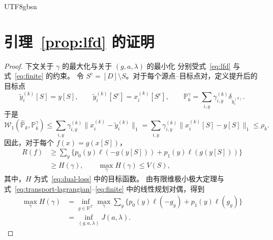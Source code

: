 \documentclass[11pt,a4paper]{article}
\theoremstyle{plain}
\begin{document}
\begin{CJK*}{UTF8}{gbsn}
\FloatBarrier
\appendix
\section{引理~\ref{prop:lfd} 的证明}\label{app:recovery}
\begin{proof}
下文关于 $\gamma$ 的最大化与关于 $(g,a,\lambda)$ 的最小化
分别受式~\eqref{eq:lfd} 与式~\eqref{eq:finite} 的约束。
令 $S^c=[D]\setminus S$。对于每个源点--目标点对，定义提升后的目标点
\[
\widetilde y_i^{(k)}[S]=y[S],\qquad
\widetilde y_i^{(k)}[S^c]=x_i^{(k)}[S^c],\qquad
\mathbb P_k^\gamma=\sum_{i,y}\gamma_{i,y}^{(k)}
\delta_{\widetilde y_i^{(k)}}.
\]
于是
\[
\mathcal W_1(\widehat{\mathbb P}_k,\mathbb P_k^\gamma)
\le\sum_{i,y}\gamma_{i,y}^{(k)}
\|x_i^{(k)}-\widetilde y_i^{(k)}\|_1
=\sum_{i,y}\gamma_{i,y}^{(k)}
\|x_i^{(k)}[S]-y[S]\|_1\le\rho_k.
\]
因此，对于每个 $f(x)=g(x[S])$，
\begin{equation}\label{eq:finite-lower}
\begin{aligned}
R(f)&\ge\sum_y\{p_0(y)\ell(-g(y[S]))+
p_1(y)\ell(g(y[S]))\}\\
&\ge H(\gamma),
\qquad
\max_\gamma H(\gamma)\le V(S),
\end{aligned}
\end{equation}
其中，$H$ 为式~\eqref{eq:dual-loss} 中的目标函数。
由有限维极小极大定理与式~\eqref{eq:transport-lagrangian}--\eqref{eq:finite}
中的线性规划对偶，得到
\begin{equation}\label{eq:finite-minimax}
\begin{aligned}
\max_\gamma H(\gamma)
&=\inf_{g\in\mathbb R^{\mathcal X}}\max_\gamma
\sum_y\{p_0(y)\ell(-g_y)+p_1(y)\ell(g_y)\}\\
&=\inf_{(g,a,\lambda)}J(a,\lambda).
\end{aligned}
\end{equation}


\end{proof}
\end{CJK*}
\end{document}
